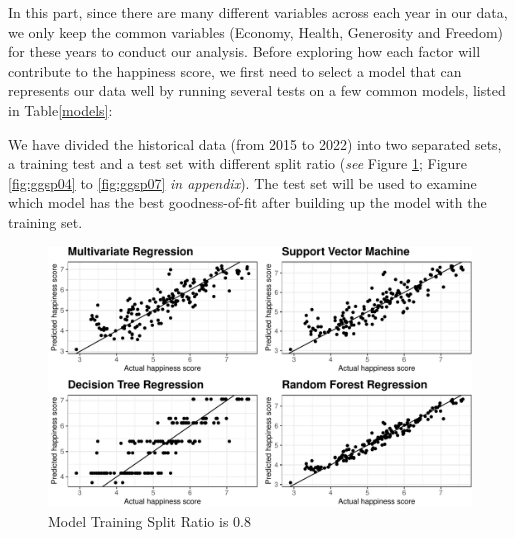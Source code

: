 \documentclass[11pt,a4paper,]{article}
\begin{document}
In this part, since there are many different variables across each year in our data, we only keep the common variables (Economy, Health, Generosity and Freedom) for these years to conduct our analysis. Before exploring how each factor will contribute to the happiness score, we first need to select a model that can represents our data well by running several tests on a few common models, listed in Table\ref{models}:

\begin{table}[H]
\caption{Model Description of our Possible Models}
\label{models}
\end{table}

We have divided the historical data (from 2015 to 2022) into two separated sets, a training test and a test set with different split ratio (\emph{see} Figure \ref{fig:training}; Figure \ref{fig:ggsp04} to \ref{fig:ggsp07} \emph{in appendix}). The test set will be used to examine which model has the best goodness-of-fit after building up the model with the training set.

\newpage

\begin{figure}
\centering
\includegraphics{Assignment4_files/figure-latex/training-1.pdf}
\caption{\label{fig:training}Model Training Split Ratio is 0.8}
\end{figure}
\end{document}
